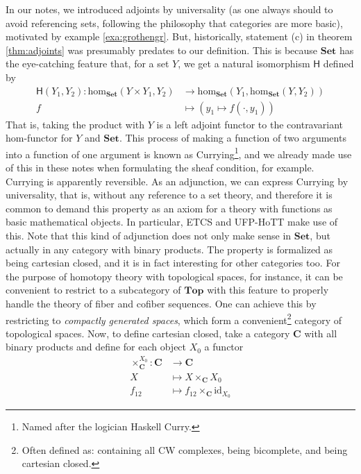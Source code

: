 In our notes, we introduced adjoints by universality (as one always should to avoid referencing sets, following the philosophy that categories are more basic), motivated by example \ref{exa:grothengr}.
But, historically, statement (c) in theorem \ref{thm:adjoints} was presumably predates to our definition.
This is because $\mathbf{Set}$ has the eye-catching feature that, for a set $Y$, we get a natural isomorphism $\mathsf{H}$ defined by
\begin{align*}
  \mathsf{H}(Y_{1},Y_{2})
  \colon
  \mathrm{hom}_{\mathbf{Set}}(Y \times Y_{1},Y_{2})
  &\rightarrow
  \mathrm{hom}_{\mathbf{Set}}
  \left(
    Y_{1},
    \mathrm{hom}_{\mathbf{Set}}(Y,Y_{2})
  \right)
  \\
  f
  &\mapsto
  \left(
    y_{1}
    \mapsto
    f(\cdot,y_{1})
  \right)
\end{align*}
That is, taking the product with $Y$ is a left adjoint functor to the contravariant hom-functor for $Y$ and $\mathbf{Set}$.
This process of making a function of two arguments into a function of one argument is known as Currying\footnote{Named after the logician Haskell Curry.}, and we already made use of this in these notes when formulating the sheaf condition, for example.
Currying is apparently reversible.
As an adjunction, we can express Currying by universality, that is, without any reference to a set theory, and therefore it is common to demand this property as an axiom for a theory with functions as basic mathematical objects.
In particular, ETCS and UFP-HoTT make use of this.
Note that this kind of adjunction does not only make sense in $\mathbf{Set}$, but actually in any category with binary products.
The property is formalized as being cartesian closed, and it is in fact interesting for other categories too.
For the purpose of homotopy theory with topological spaces, for instance, it can be convenient to restrict to a subcategory of $\mathbf{Top}$ with this feature to properly handle the theory of fiber and cofiber sequences.
One can achieve this by restricting to \textit{compactly generated spaces}, which form a convenient\footnote{Often defined as: containing all CW complexes, being bicomplete, and being cartesian closed.} category of topological spaces.
Now, to define cartesian closed, take a category $\mathbf{C}$ with all binary products and define for each object $X_{0}$ a functor
\begin{align*}
  \times_{\mathbf{C}}^{X_{0}}
  \colon
  \mathbf{C}
  &\rightarrow
  \mathbf{C}
  \\
  X
  &\mapsto
  X
  \times_{\mathbf{C}}
  X_{0}
  \\
  f_{12}
  &\mapsto
  f_{12}
  \times_{\mathbf{C}}
  \mathrm{id}_{X_{0}}
\end{align*}
